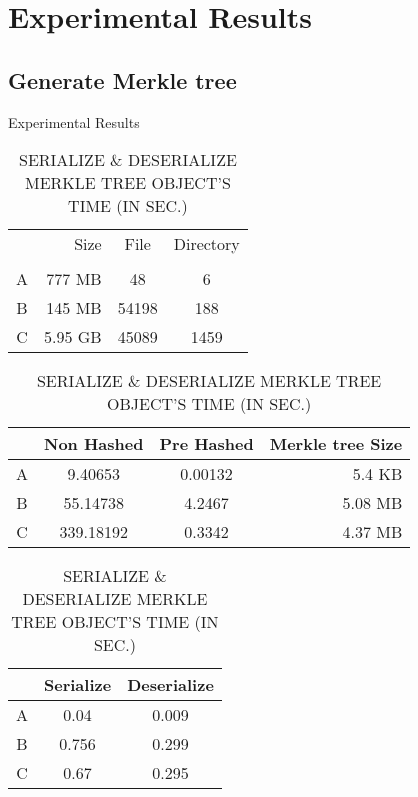 \section{Experimental Results}

\subsection{Generate Merkle tree}
\begin{frame}{Experimental Results}
	\begin{table}[]
		\scriptsize
		\centering
		\begin{tabular}{crcc}
			  & Size    & File  & Directory \\
			  &			&		&		    \\
			A & 777 MB  & 48    & 6         \\
			B & 145 MB  & 54198 & 188       \\
			C & 5.95 GB & 45089 & 1459      \\
		\end{tabular}
        
		\caption{GENERATE MERKLE TREE'S TIME (IN SEC.)}
		\begin{tabular}{|c|c|c|r|}
			\hline
              & Non Hashed & Pre Hashed & Merkle tree Size \\ \hline
            A & 9.40653    & 0.00132    & 5.4 KB           \\ \hline
            B & 55.14738   & 4.2467     & 5.08 MB          \\ \hline
            C & 339.18192  & 0.3342     & 4.37 MB          \\ \hline
		\end{tabular}
        
        \caption{SERIALIZE \& DESERIALIZE MERKLE TREE OBJECT'S TIME (IN SEC.)}
		\begin{tabular}{|c|c|c|}
            \hline
              & Serialize & Deserialize \\ \hline
            A & 0.04      & 0.009       \\ \hline
            B & 0.756     & 0.299       \\ \hline
            C & 0.67      & 0.295       \\ \hline
		\end{tabular}
	\end{table}
\end{frame}


